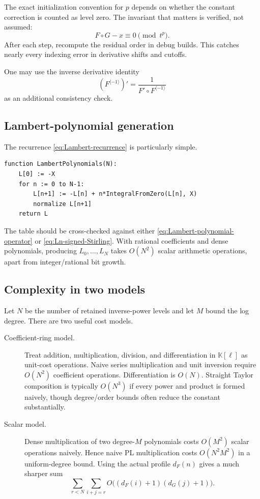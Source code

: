 \documentclass[11pt,oneside]{article}
\numberwithin{equation}{section}
\theoremstyle{definition}
\newcommand{\K}{\mathbb K}
\newcommand{\rev}{\langle -1\rangle}
\begin{document}
The exact initialization convention for \(p\) depends on whether the constant
correction is counted as level zero.  The invariant that matters is verified,
not assumed:
\[
  F\circ G-x\equiv0\pmod{t^p}.
\]
After each step, recompute the residual order in debug builds.  This catches
nearly every indexing error in derivative shifts and cutoffs.

One may use the inverse derivative identity
\begin{equation}\label{eq:inverse-derivative-identity}
  (F^{\rev})'=\frac{1}{F'\circ F^{\rev}}
\end{equation}
as an additional consistency check.

\subsection{Lambert-polynomial generation}

The recurrence \eqref{eq:Lambert-recurrence} is particularly simple.

\begin{lstlisting}[style=pseudocode,caption={Exact Lambert polynomials.}]
function LambertPolynomials(N):
    L[0] := -X
    for n := 0 to N-1:
        L[n+1] := -L[n] + n*IntegralFromZero(L[n], X)
        normalize L[n+1]
    return L
\end{lstlisting}

The table should be cross-checked against either
\eqref{eq:Lambert-polynomial-operator} or
\eqref{eq:Ln-signed-Stirling}.  With rational coefficients and dense
polynomials, producing \(L_0,\ldots,L_N\) takes \(O(N^2)\) scalar arithmetic
operations, apart from integer/rational bit growth.

\subsection{Complexity in two models}

Let \(N\) be the number of retained inverse-power levels and let \(M\) bound the
log degree.  There are two useful cost models.

\begin{description}
\item[Coefficient-ring model.]  Treat addition, multiplication, division, and
  differentiation in \(\K[\ell]\) as unit-cost operations.  Naive series
  multiplication and unit inversion require \(O(N^2)\) coefficient operations.
  Differentiation is \(O(N)\).  Straight Taylor composition is typically
  \(O(N^3)\) if every power and product is formed naively, though degree/order
  bounds often reduce the constant substantially.
\item[Scalar model.]  Dense multiplication of two degree-\(M\) polynomials costs
  \(O(M^2)\) scalar operations naively.  Hence naive PL multiplication costs
  \(O(N^2M^2)\) in a uniform-degree bound.  Using the actual profile
  \(d_F(n)\) gives a much sharper sum
  \[
    \sum_{r<N}\sum_{i+j=r}
      O\bigl((d_F(i)+1)(d_G(j)+1)\bigr).
  \]
\end{description}
\end{document}
